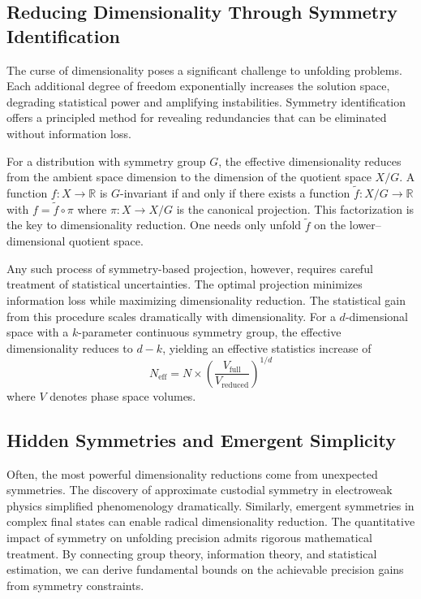     \subsection{Reducing Dimensionality Through Symmetry Identification}
        The curse of dimensionality poses a significant challenge to unfolding problems.
        Each additional degree of freedom exponentially increases the solution space, degrading statistical power and amplifying instabilities.
        Symmetry identification offers a principled method for revealing redundancies that can be eliminated without information loss.
        
        For a distribution with symmetry group \(G\), the effective dimensionality reduces from the ambient space dimension to the dimension of the quotient space \(X/G\).
        A function \(f: X \rightarrow \mathbb{R}\) is \(G\)-invariant if and only if there exists a function \(\tilde{f}: X/G \rightarrow \mathbb{R}\) with \(f = \tilde{f} \circ \pi\) where \(\pi: X \rightarrow X/G\) is the canonical projection.
        This factorization is the key to dimensionality reduction.
        One needs only unfold \(\tilde{f}\) on the lower--dimensional quotient space.

        Any such process of symmetry-based projection, however, requires careful treatment of statistical uncertainties.
        The optimal projection minimizes information loss while maximizing dimensionality reduction.
        The statistical gain from this procedure scales dramatically with dimensionality.
        For a \(d\)-dimensional space with a \(k\)-parameter continuous symmetry group, the effective dimensionality reduces to \(d-k\), yielding an effective statistics increase of
        \[
            N_\text{eff} = N \times \left(\frac{V_\text{full}}{V_\text{reduced}}\right)^{1/d}
        \]
        where \(V\) denotes phase space volumes.
        
        \subsection{Hidden Symmetries and Emergent Simplicity}
            Often, the most powerful dimensionality reductions come from unexpected symmetries.
            The discovery of approximate custodial symmetry in electroweak physics simplified phenomenology dramatically.
            Similarly, emergent symmetries in complex final states can enable radical dimensionality reduction.
            The quantitative impact of symmetry on unfolding precision admits rigorous mathematical treatment.
            By connecting group theory, information theory, and statistical estimation, we can derive fundamental bounds on the achievable precision gains from symmetry constraints.

